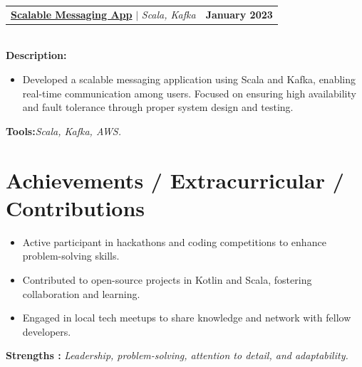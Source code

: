 \documentclass[letterpaper,11pt]{article}
\makeatletter
\newcommand{\resumeItem}[1]{
  \item\small{
    {#1 \vspace{-2pt}}
  }
}
\newcommand{\resumeProjectHeading}[2]{
    \item
    \begin{tabular*}{1.001\textwidth}{l@{\extracolsep{\fill}}r}
      \small#1 & \textbf{\small #2}\\
    \end{tabular*}\vspace{-7pt}
}
\newcommand{\resumeSubHeadingListStart}{\begin{itemize}[leftmargin=0.0in, label={}]}
\newcommand{\resumeSubHeadingListEnd}{\end{itemize}}
\newcommand{\resumeItemListStart}{\begin{itemize}}
\newcommand{\resumeItemListEnd}{\end{itemize}\vspace{-5pt}}
\makeatother
\begin{document}
\resumeProjectHeading
{\href{https://github.com/yakkshit/Scalable-Messaging-App}{\textbf{Scalable Messaging App}} $|$ \emph{Scala, Kafka}}{January 2023}\\
\vspace{6pt}
\textbf{Description:}
\vspace{-5pt}
\resumeItemListStart
\resumeItem{Developed a scalable messaging application using Scala and Kafka, enabling real-time communication among users. Focused on ensuring high availability and fault tolerance through proper system design and testing.}
\resumeItemListEnd
\vspace{4pt}
\textbf{Tools:}\emph{Scala, Kafka, AWS.}
\vspace{-12pt}

\section{Achievements / Extracurricular / Contributions}
\resumeSubHeadingListStart
\resumeItemListStart
\resumeItem{Active participant in hackathons and coding competitions to enhance problem-solving skills.}
\resumeItem{Contributed to open-source projects in Kotlin and Scala, fostering collaboration and learning.}
\resumeItem{Engaged in local tech meetups to share knowledge and network with fellow developers.}
\resumeItemListEnd

\resumeSubHeadingListEnd
\textbf{Strengths : }\emph{Leadership, problem-solving, attention to detail, and adaptability.} \\

\vspace{10pt}
\end{document}
